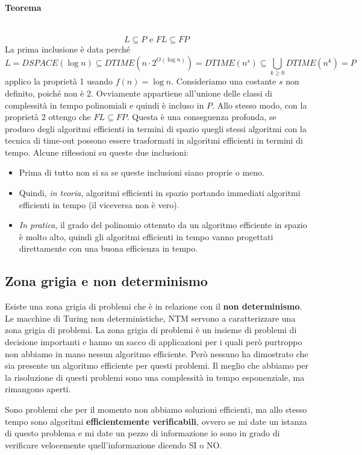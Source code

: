 \documentclass{article}
\begin{document}
\paragraph{Teorema}\mbox{}\\
$$L\subseteq P\text{ e }FL\subseteq FP$$
La prima inclusione è data perché
$$L=DSPACE(\log n)\subseteq DTIME(n\cdot 2^{O(\log n)})=DTIME(n^s)\subseteq \bigcup_{k\geq 0}DTIME(n^k)=P$$
applico la proprietà 1 usando $f(n)=\log n$. Consideriamo una costante $s$ non definito,
poiché non è 2. Ovviamente appartiene all'unione delle classi di complessità in tempo polinomiali
e quindi è incluso in $P$. Allo stesso modo, con la proprietà 2 ottengo che $FL\subseteq FP$.
Questa è una conseguenza profonda, se produco degli algoritmi efficienti in termini di spazio
quegli stessi algoritmi con la tecnica di time-out possono essere trasformati in algoritmi efficienti
in termini di tempo.
Alcune riflessioni su queste due inclusioni:
\begin{itemize}
    \item Prima di tutto non si sa se queste inclusioni siano proprie o meno.
    \item Quindi, \textit{in teoria}, algoritmi efficienti in spazio portando immediati
          algoritmi efficienti in tempo (il viceversa non è vero).
    \item \textit{In pratica}, il grado del polinomio ottenuto da un algoritmo efficiente
          in spazio è molto alto, quindi gli algoritmi efficienti in tempo vanno progettati
          direttamente con una buona efficienza in tempo.
\end{itemize}

\subsection{Zona grigia e non determinismo}
Esiste una zona grigia di problemi che è in relazione con il \textbf{non determinismo}. Le macchine
di Turing non deterministiche, NTM servono a caratterizzare una zona grigia di problemi.
La zona grigia di problemi è un insieme di problemi di decisione importanti e hanno un sacco di applicazioni
per i quali però purtroppo non abbiamo in mano nessun algoritmo efficiente. Però nessuno ha dimostrato
che sia presente un algoritmo efficiente per questi problemi. Il meglio che abbiamo per la risoluzione
di questi problemi sono una complessità in tempo esponenziale, ma rimangono aperti.

Sono problemi che per il momento non abbiamo soluzioni efficienti, ma allo stesso tempo sono algoritmi
\textbf{efficientemente verificabili}, ovvero se mi date un istanza di questo problema e mi date un
pezzo di informazione io sono in grado di verificare velocemente quell'informazione dicendo SI o NO.
\end{document}
